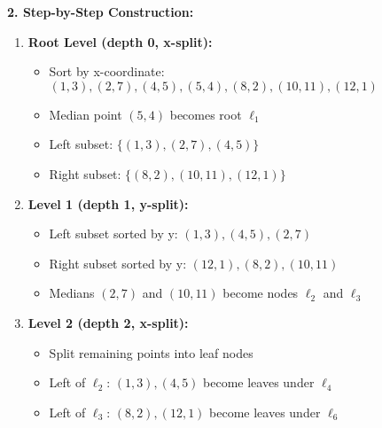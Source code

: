 \textbf{2. Step-by-Step Construction:}
\begin{enumerate}[leftmargin=*,noitemsep]
    \item \textbf{Root Level (depth 0, x-split):}
    \begin{itemize}[noitemsep]
        \item Sort by x-coordinate: $(1,3), (2,7), (4,5), (5,4), (8,2), (10,11), (12,1)$
        \item Median point $(5,4)$ becomes root $\ell_1$
        \item Left subset: $\{(1,3), (2,7), (4,5)\}$
        \item Right subset: $\{(8,2), (10,11), (12,1)\}$
    \end{itemize}

    \item \textbf{Level 1 (depth 1, y-split):}
    \begin{itemize}[noitemsep]
        \item Left subset sorted by y: $(1,3), (4,5), (2,7)$
        \item Right subset sorted by y: $(12,1), (8,2), (10,11)$
        \item Medians $(2,7)$ and $(10,11)$ become nodes $\ell_2$ and $\ell_3$
    \end{itemize}

    \item \textbf{Level 2 (depth 2, x-split):}
    \begin{itemize}[noitemsep]
        \item Split remaining points into leaf nodes
        \item Left of $\ell_2$: $(1,3), (4,5)$ become leaves under $\ell_4$
        \item Left of $\ell_3$: $(8,2), (12,1)$ become leaves under $\ell_6$
    \end{itemize}
\end{enumerate}

